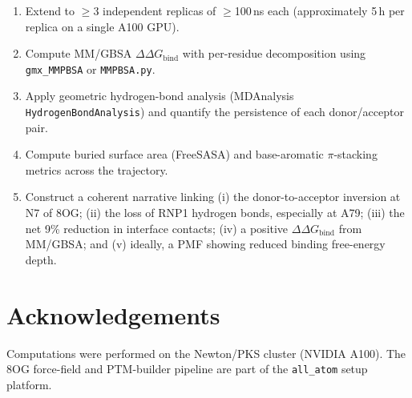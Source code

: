 \documentclass[11pt,a4paper]{article}
\begin{document}
\begin{enumerate}[leftmargin=*]
\item Extend to $\geq$3 independent replicas of $\geq$100\,ns each
(approximately 5\,h per replica on a single A100 GPU).
\item Compute MM/GBSA $\Delta\Delta G_{\text{bind}}$ with per-residue
decomposition using \texttt{gmx\_MMPBSA} or \texttt{MMPBSA.py}.
\item Apply geometric hydrogen-bond analysis
(MDAnalysis \texttt{HydrogenBondAnalysis}) and quantify the persistence
of each donor/acceptor pair.
\item Compute buried surface area (FreeSASA) and base-aromatic
$\pi$-stacking metrics across the trajectory.
\item Construct a coherent narrative linking
(i) the donor-to-acceptor inversion at N7 of 8OG;
(ii) the loss of RNP1 hydrogen bonds, especially at A79;
(iii) the net 9\% reduction in interface contacts;
(iv) a positive $\Delta\Delta G_{\text{bind}}$ from MM/GBSA;
and (v) ideally, a PMF showing reduced binding free-energy depth.
\end{enumerate}

\section*{Acknowledgements}
\small Computations were performed on the Newton/PKS cluster (NVIDIA A100).
The 8OG force-field and PTM-builder pipeline are part of the
\texttt{all\_atom} setup platform.
\end{document}
